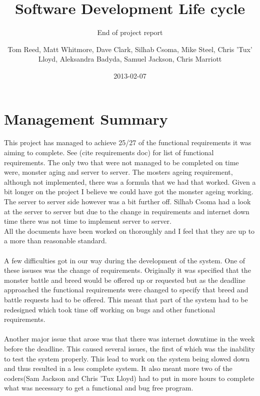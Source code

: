 \documentclass{project}
\begin{document}
\title{Software Development Life cycle}
\subtitle{End of project report}
\author{Tom Reed, Matt Whitmore, Dave Clark, Silhab Csoma, Mike Steel, Chris 'Tux' Lloyd, Aleksandra Badyda, Samuel Jackson, Chris Marriott}
\date{2013-02-07}
\maketitle
\tableofcontents
\newpage



\section{Management Summary}
This project has managed to achieve 25/27 of the functional requirements it was aiming to complete. See (cite requirements doc) for list of functional requirements. The only two that were not managed to be completed on time were, monster aging and server to server. The mosters ageing requirement, although not implemented, there was a formula that we had that worked. Given a bit longer on the project I believe we could have got the monster ageing working. The server to server side however was a bit further off. Silhab Csoma had a look at the server to server but due to the change in requirements and internet down time there was not time to implement server to server.
\\
All the documents have been worked on thoroughly and I feel that they are up to a more than reasonable standard.
\\
\\
A few difficulties got in our way during the development of the system. One of these issuses was the change of requirements. Originally it was specified that the monster battle and breed would be offered up or requested but as the deadline approached the functional requirements were changed to specify that breed and battle requests had to be offered. This meant that part of the system had to be redesigned which took time off working on bugs and other functional requirements. 
\\
\\
Another major issue that arose was that there was internet downtime in the week before the deadline. This caused several issues, the first of which was the inability to test the system properly. This lead to work on the system being slowed down and thus resulted in a less complete system. It also meant more two of the coders(Sam Jackson and Chris 'Tux Lloyd) had to put in more hours to complete what was necessary to get a functional and bug free program. 
\end{document}
